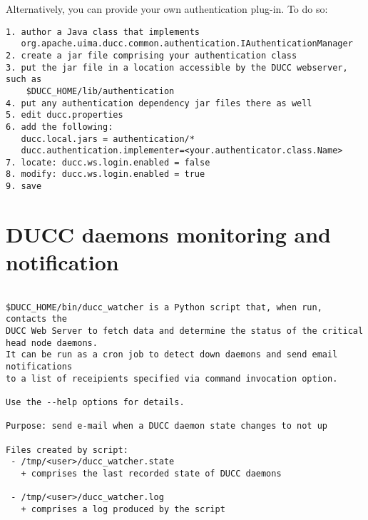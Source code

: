     Alternatively, you can provide your own authentication plug-in.  To do so:
\begin{verbatim}    
1. author a Java class that implements 
   org.apache.uima.ducc.common.authentication.IAuthenticationManager
2. create a jar file comprising your authentication class
3. put the jar file in a location accessible by the DUCC webserver, such as 
    $DUCC_HOME/lib/authentication
4. put any authentication dependency jar files there as well
5. edit ducc.properties
6. add the following:
   ducc.local.jars = authentication/*
   ducc.authentication.implementer=<your.authenticator.class.Name>
7. locate: ducc.ws.login.enabled = false
8. modify: ducc.ws.login.enabled = true
9. save   
\end{verbatim}    

 
\section{DUCC daemons monitoring and notification}

\begin{verbatim}

$DUCC_HOME/bin/ducc_watcher is a Python script that, when run, contacts the 
DUCC Web Server to fetch data and determine the status of the critical head node daemons.
It can be run as a cron job to detect down daemons and send email notifications
to a list of receipients specified via command invocation option.

Use the --help options for details.

Purpose: send e-mail when a DUCC daemon state changes to not up

Files created by script:
 - /tmp/<user>/ducc_watcher.state
   + comprises the last recorded state of DUCC daemons

 - /tmp/<user>/ducc_watcher.log
   + comprises a log produced by the script
      
\end{verbatim}